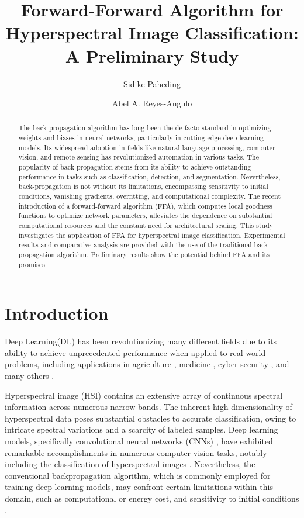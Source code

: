 \documentclass{article}
\title{Forward-Forward Algorithm for Hyperspectral Image Classification: A Preliminary Study}
\author[]{Sidike Paheding }
\author[]{Abel A. Reyes-Angulo }
\affil[]{\textit{Dept. of Applied Computing, Michigan Technological University, Houghton, MI 49931, USA}}
\date{}
\begin{document}
\maketitle

\begin{abstract}
    
    The back-propagation algorithm has long been the de-facto standard in optimizing weights and biases in neural networks, particularly in cutting-edge deep learning models. Its widespread adoption in fields like natural language processing, computer vision, and remote sensing has revolutionized automation in various tasks. The popularity of back-propagation stems from its ability to achieve outstanding performance in tasks such as classification, detection, and segmentation. Nevertheless, back-propagation is not without its limitations, encompassing sensitivity to initial conditions, vanishing gradients, overfitting, and computational complexity. The recent introduction of a forward-forward algorithm (FFA), which computes local goodness functions to optimize network parameters, alleviates the dependence on substantial computational resources and the constant need for architectural scaling. This study investigates the application of FFA for hyperspectral image classification. Experimental results and comparative analysis are provided with the use of the traditional back-propagation algorithm. Preliminary results show the potential behind FFA and its promises.  
\end{abstract}

\section{Introduction}
Deep Learning(DL) \cite{lecun2015deep} has been revolutionizing many different fields due to its ability to achieve unprecedented performance when applied to real-world problems, including applications in agriculture \cite{kamilaris2018deep, maimaitijiang2020soybean}, medicine \cite{ching2018opportunities}, cyber-security \cite{mahdavifar2019application}, and many others \cite{bourilkov2019machine, khan2021trends, siddique2021u, najafabadi2015deep, alom2019state}.

Hyperspectral image (HSI) contains an extensive array of continuous spectral information across numerous narrow bands. The inherent high-dimensionality of hyperspectral data poses substantial obstacles to accurate classification, owing to intricate spectral variations and a scarcity of labeled samples. Deep learning models, specifically convolutional neural networks (CNNs) \cite{lecun1998gradient}, have exhibited remarkable accomplishments in numerous computer vision tasks, notably including the classification of hyperspectral images \cite{hu2015deep, li2019deep}. Nevertheless, the conventional backpropagation algorithm, which is commonly employed for training deep learning models, may confront certain limitations within this domain, such as computational or energy cost, and sensitivity to initial conditions \cite{sexton2000comparative, hinton2022forward}.
\end{document}
